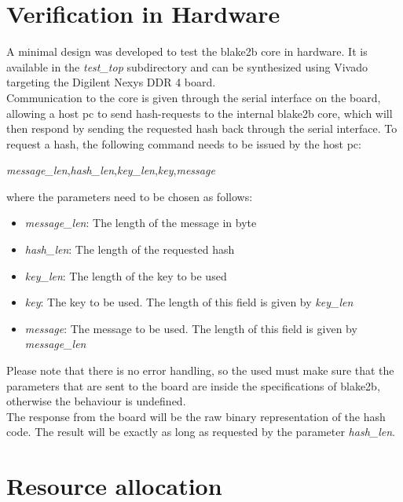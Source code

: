 \documentclass[%
	a4paper,
]
{article}
\newcommand{\todo}[1]{\textcolor{red}{#1}}
\begin{document}
\section{Verification in Hardware}
A minimal design was developed to test the blake2b core in hardware. It is
available in the \emph{test\_top} subdirectory and can be synthesized using
Vivado targeting the Digilent Nexys DDR 4 board.\\
Communication to the core is given through the serial interface on the board,
allowing a host pc to send hash-requests to the internal blake2b core, which
will then respond by sending the requested hash back through the serial
interface. To request a hash, the following command needs to be issued by the
host pc:
\begin{center}
\emph{message\_len},\emph{hash\_len},\emph{key\_len},\emph{key},\emph{message}
\end{center}
where the parameters need to be chosen as follows:
\begin{itemize}
	\item \emph{message\_len}: The length of the message in byte
	\item \emph{hash\_len}: The length of the requested hash
	\item \emph{key\_len}: The length of the key to be used
	\item \emph{key}: The key to be used. The length of this field is given by
		\emph{key\_len}
	\item \emph{message}: The message to be used. The length of this field is given by
		\emph{message\_len}
\end{itemize}
Please note that there is no error handling, so the used must make sure that the
parameters that are sent to the board are inside the specifications of blake2b,
otherwise the behaviour is undefined.\\
The response from the board will be the raw binary representation of the hash
code. The result will be exactly as long as requested by the parameter
\emph{hash\_len}.

\section{Resource allocation}
\label{sec:resource-allocation}

\end{document}
